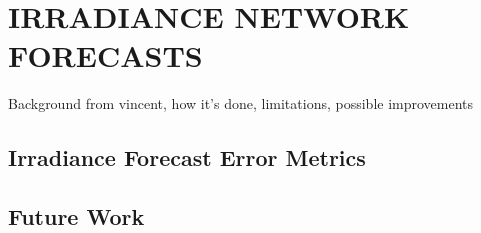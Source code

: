 \chapter{IRRADIANCE NETWORK FORECASTS}
\label{chap:network}

Background from vincent, how it's done, limitations, possible
improvements

\section{Irradiance Forecast Error Metrics}

\section{Future Work}

